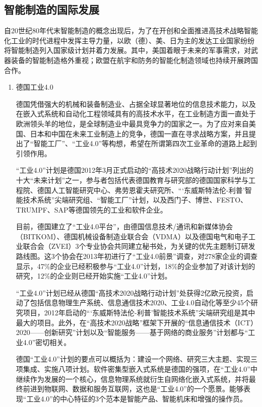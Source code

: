 \documentclass[lang=cn,12pt,bibtex,newtx,twoside,margintrue,citestyle=gb7714-2015, bibstyle=gb7714-2015]{elegantbook}
\begin{document}
\subsection{智能制造的国际发展}
\label{sec:org6cf3059}
自20世纪80年代末智能制造的概念出现后，为了在开创和全面推进高技术战略智能化工业的时代进程中发挥主导力量，以欧（德）、美、日为主的发达工业国家纷纷将智能制造列入国家级计划并着力发展。其中，美国着眼于未来的军事需求，对武器装备的智能制造格外重视；欧盟在航宇和防务的智能化制造领域也持续开展跨国合作。
\begin{enumerate}
\item 德国工业4.0
\label{sec:orgd74d5ae}

\setlength{\parindent}{2em}
德国凭借强大的机械和装备制造业、占据全球显著地位的信息技术能力，以及在嵌入式系统和自动化工程领域具有的高技术水平，在工业制造方面一直处于欧洲领头羊的地位，是全球制造业中最具竞争力的国家之一。为了应对来自美国、日本和中国在未来工业制造上的竞争，德国一直在寻求战略方案，并且提出了“智能工厂”、“工业4.0”等构想，希望在所谓第四次工业革命的道路上起到引领作用。

“工业4.0”计划是德国2012年3月正式启动的“高技术2020战略行动计划”列出的十大“未来计划”之一，参与者包括代表德国教育与研究部的德国国家科学与工程院、德国人工智能研究中心、弗劳恩霍夫研究所、“‘东威斯特法伦-利普’智能技术系统”尖端研究组、“智能工厂”计划，以及西门子、博世、FESTO、TRUMPF、SAP等德国领先的工业和软件企业\cite{Bunse2013}。

目前，德国建立了“工业4.0平台”，由德国信息技术/通讯和新媒体协会（BITKOM）、德国机械设备制造业联合会（VDMA）以及德国电气和电子工业联合会（ZVEI）3个专业协会共同建立秘书处，为关键的优先主题制订研发路线图。这3个协会在2013年初进行了“工业4.0前景”调查，对278家企业的调查显示，47\%的企业已经积极参与“工业4.0”计划，18\%的企业参加了对该计划的研究，12\%的企业则已经开始实施“工业4.0”计划。

“工业4.0”计划已经从德国“高技术2020战略行动计划”处获得2亿欧元投资，启动了包括信息物理生产系统、信息通信技术2020、工业4.0自动化等至少45个研究项目，2012年启动的“‘东威斯特法伦-利普’智能技术系统”尖端研究组是其中最大的项目。此外，在“高技术2020战略”框架下开展的“信息通信技术（ICT）2020——创新研究”计划以及“智能服务——基于网络的商业服务”计划都与“工业4.0”密切相关。

德国“工业4.0”计划的要点可以概括为：建设一个网络、研究三大主题、实现三项集成、实施八项计划。软件密集型嵌入式系统是德国的强项，在“工业4.0”中继续作为发展的一个核心，信息物理系统就衍生自网络化嵌入式系统，并将最终前进到物联网、数据和服务互联网，这也是“工业4.0”的一个愿景。能够表现“工业4.0”的中心特征的3个范本是智能产品、智能机床和增强的操作员。


\end{enumerate}
\end{document}
